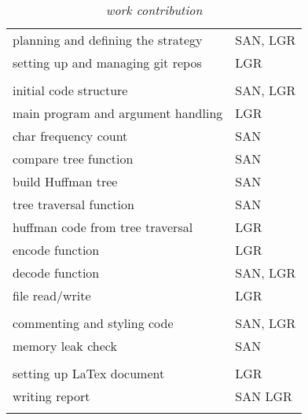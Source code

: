 \documentclass[a4paper,11pt,twoside]{article}
\begin{document}
\begin{table}[]
\centering
\caption{\textit{work contribution}}
\label{tab:contribution}
\begin{tabular}{ll}
planning and defining the strategy & SAN, LGR \\
setting up and managing git repos  & LGR      \\
                                   &          \\
initial code structure             & SAN, LGR \\
main program and argument handling & LGR      \\
char frequency count               & SAN      \\
compare tree function              & SAN      \\
build Huffman tree                 & SAN      \\
tree traversal function            & SAN      \\
huffman code from tree traversal   & LGR      \\
encode function                    & LGR      \\
decode function                    & SAN, LGR \\
file read/write                    & LGR      \\
                                   &          \\
commenting and styling code        & SAN, LGR \\
memory leak check                  & SAN      \\
                                   &          \\
setting up LaTex document          & LGR      \\
writing report                     & SAN LGR  \\
                                   &         
\end{tabular}
\end{table}



\end{document}
